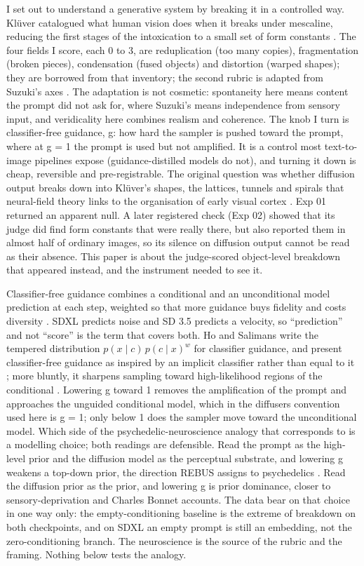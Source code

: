 \documentclass[11pt]{article}
\begin{document}
I set out to understand a generative system by breaking it in a controlled way.
Klüver catalogued what human vision does when it breaks under mescaline,
reducing the first stages of the intoxication to a small set of form constants
\citep{kluver1966}. The four fields I score, each 0 to 3, are reduplication (too
many copies), fragmentation (broken pieces), condensation (fused objects) and
distortion (warped shapes); they are borrowed from that inventory; the second
rubric is adapted from Suzuki's axes \citep{suzuki2024}. The adaptation is not
cosmetic: spontaneity here means content the prompt did not ask for, where
Suzuki's means independence from sensory input, and veridicality here combines
realism and coherence. The knob I turn is classifier-free guidance, g: how hard
the sampler is pushed toward the prompt, where at g = 1 the prompt is used but
not amplified. It is a control most text-to-image pipelines expose
(guidance-distilled models do not), and turning it down is cheap, reversible and
pre-registrable. The original question was whether diffusion output breaks down
into Klüver's shapes, the lattices, tunnels and spirals that neural-field theory
links to the organisation of early visual cortex \citep{bressloff2001}. Exp 01
returned an apparent null. A later registered check (Exp 02) showed that its
judge did find form constants that were really there, but also reported them in
almost half of ordinary images, so its silence on diffusion output cannot be
read as their absence. This paper is about the judge-scored object-level
breakdown that appeared instead, and the instrument needed to see it.

Classifier-free guidance combines a conditional and an unconditional model
prediction at each step, weighted so that more guidance buys fidelity and costs
diversity \citep{ho2022cfg}. SDXL predicts noise and SD 3.5 predicts a velocity,
so ``prediction'' and not ``score'' is the term that covers both. Ho and
Salimans write the tempered distribution \(p(x \mid c)\,p(c \mid x)^{w}\) for
classifier guidance, and present classifier-free guidance as inspired by an
implicit classifier rather than equal to it \citep{ho2022cfg}; more bluntly, it
sharpens sampling toward high-likelihood regions of the conditional
\citep{kynkaanniemi2024interval, karras2024autoguidance}. Lowering g toward 1
removes the amplification of the prompt and approaches the unguided conditional
model, which in the diffusers convention used here is g = 1; only below 1 does
the sampler move toward the unconditional model. Which side of the
psychedelic-neuroscience analogy that corresponds to is a modelling choice; both
readings are defensible. Read the prompt as the high-level prior and the
diffusion model as the perceptual substrate, and lowering g weakens a top-down
prior, the direction REBUS assigns to psychedelics
\citep{carhartharris2019rebus}. Read the diffusion prior as the prior, and
lowering g is prior dominance, closer to sensory-deprivation and Charles Bonnet
accounts. The data bear on that choice in one way only: the empty-conditioning
baseline is the extreme of breakdown on both checkpoints, and on SDXL an empty
prompt is still an embedding, not the zero-conditioning branch. The neuroscience
is the source of the rubric and the framing. Nothing below tests the analogy.
\end{document}
